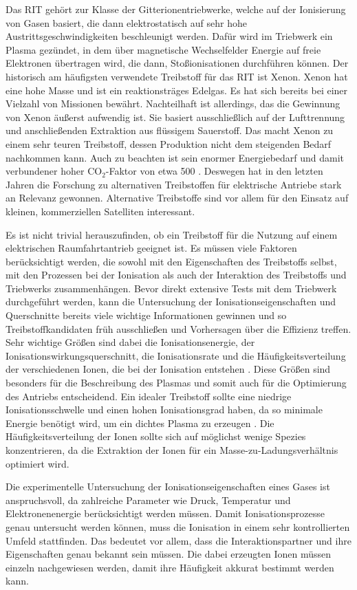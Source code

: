 Das RIT gehört zur Klasse der Gitterionentriebwerke, welche auf der Ionisierung von Gasen basiert, die dann elektrostatisch auf sehr hohe Austrittsgeschwindigkeiten beschleunigt werden. Dafür wird im Triebwerk ein Plasma gezündet, in dem über magnetische Wechselfelder Energie auf freie Elektronen übertragen wird, die dann, Stoßionisationen durchführen können. Der historisch am häufigsten verwendete Treibstoff für das RIT ist Xenon. Xenon hat eine hohe Masse und ist ein reaktionsträges Edelgas. Es hat sich bereits bei einer Vielzahl von Missionen bewährt. Nachteilhaft ist allerdings, das die Gewinnung von Xenon äußerst aufwendig ist. Sie basiert ausschließlich auf der Lufttrennung und anschließenden Extraktion aus flüssigem Sauerstoff. Das macht Xenon zu einem sehr teuren Treibstoff, dessen Produktion nicht dem steigenden Bedarf nachkommen kann. Auch zu beachten ist sein enormer Energiebedarf und damit verbundener hoher CO$_2$-Faktor von etwa 500 \cite{CO2}. Deswegen hat in den letzten Jahren die Forschung zu alternativen Treibstoffen für elektrische Antriebe stark an Relevanz gewonnen. Alternative Treibstoffe sind vor allem für den Einsatz auf kleinen, kommerziellen Satelliten interessant. 

Es ist nicht trivial herauszufinden, ob ein Treibstoff für die Nutzung auf einem elektrischen Raumfahrtantrieb geeignet ist. Es müssen viele Faktoren berücksichtigt werden, die sowohl mit den Eigenschaften des Treibstoffs selbst, mit den Prozessen bei der Ionisation als auch der Interaktion des Treibstoffs und Triebwerks zusammenhängen. Bevor direkt extensive Tests mit dem Triebwerk durchgeführt werden, kann die Untersuchung der Ionisationseigenschaften und Querschnitte bereits viele wichtige Informationen gewinnen und so Treibstoffkandidaten früh ausschließen und Vorhersagen über die Effizienz treffen. Sehr wichtige Größen sind dabei die Ionisationsenergie, der Ionisationswirkungsquerschnitt, die Ionisationsrate und die Häufigkeitsverteilung der verschiedenen Ionen, die bei der Ionisation entstehen \cite{ion}. Diese Größen sind besonders für die Beschreibung des Plasmas und somit auch für die Optimierung des Antriebs entscheidend. Ein idealer Treibstoff sollte eine niedrige Ionisationsschwelle und einen hohen Ionisationsgrad haben, da so minimale Energie benötigt wird, um ein dichtes Plasma zu erzeugen \cite{Prop}. Die Häufigkeitsverteilung der Ionen sollte sich auf möglichst wenige Spezies konzentrieren, da die Extraktion der Ionen für ein Masse-zu-Ladungsverhältnis optimiert wird.

Die experimentelle Untersuchung der Ionisationseigenschaften eines Gases ist anspruchsvoll, da zahlreiche Parameter wie Druck, Temperatur und Elektronenenergie berücksichtigt werden müssen. Damit Ionisationsprozesse genau untersucht werden können, muss die Ionisation in einem sehr kontrollierten Umfeld stattfinden. Das bedeutet vor allem, dass die Interaktionspartner und ihre Eigenschaften genau bekannt sein müssen. Die dabei erzeugten Ionen müssen einzeln nachgewiesen werden, damit ihre Häufigkeit akkurat bestimmt werden kann. 

